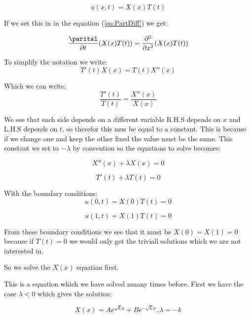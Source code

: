 \documentclass[a4paper,10pt]{article}
\begin{document}
\begin{equation}
 u(x,t) = X(x)T(t)
 \label{eq:u_xt}
\end{equation}

If we set this in in the equation (\ref{eq:PartDiff}) we get:

\begin{equation}
 
 \frac{\parital}{\partial t}(X(x)T(t)) = \frac{\partial ^2}{\partial x^2}(X(x)T(t))
\end{equation}

To simplify the notation we write:
\begin{equation}
 T'(t)X(x) = T(t)X''(x)
\end{equation}

Which we can write:
\begin{equation}
 \frac{T'(t)}{T(t)} = \frac{X''(x)}{X(x)}
\end{equation}

We see that each side depends on a different variable R.H.S depends on $x$ and L.H.S depends on $t$, so therefor this mus be equal to a constant.
This is because if we change one and keep the other fixed the value must be the same. This constant we set to $-\lambda$ by convention so the equations
to solve becomes:

\begin{equation}
 X''(x) + \lambda X(x) = 0
\end{equation}

\begin{equation}
 T'(t) + \lambda T(t) = 0
\end{equation}

With the boundary conditions:
\begin{equation}
 u(0,t) = X(0)T(t) = 0
\end{equation}

\begin{equation}
 u(1,t) = X(1)T(t) = 0
\end{equation}

From these boundary conditions we see that it must be $X(0) = X(1) = 0$ because if $T(t)=0$ we would only get the triviall solutions which we are not interested in.

So we solve the $X(x)$ equation first.

This is a equation which we have solved nmany times before. First we have the case $\lambda < 0$ which gives the solution:

\begin{equation}
 X(x) = Ae^{\sqrt{k}x} + Be^{-\sqrt{k}x}, \lambda=-k
\end{equation}
\end{document}
